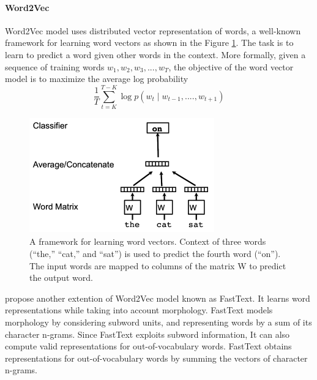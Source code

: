 \paragraph{Word2Vec} Word2Vec model uses distributed vector representation of words, a well-known framework for learning word vectors as shown in the Figure \ref{fig:Word2Vec model}. The task is to learn to predict a word given other words in the context.
More formally, given a sequence of training words
$w_{1}, w_{2}, w_{3}, ..., w_{T} $, the objective of the word vector model is to maximize the average log probability
\\
\begin{equation}
\frac{1}{T} \sum_{t=K}^{T-K} \log p(w_{t} \mid w_{t-1},....,w_{t+1}) 
\end{equation}

\begin{figure}[h]
	\centering
	\includegraphics[width=8cm, height=5cm]{w2v.png}
	\caption{A framework for learning word vectors. Context of
		three words (“the,” “cat,” and “sat”) is used to predict the fourth
		word (“on”). The input words are mapped to columns of the matrix
		W to predict the output word.}
	\label{fig:Word2Vec model}
\end{figure}


 \cite{bojanowski2016enriching} propose another extention of Word2Vec model known as FastText. It learns word
 representations while taking into account morphology.
 FastText models morphology by considering subword
 units, and representing words by a sum of its character
 n-grams.  Since FastText exploits subword information, It can also
 compute valid representations for out-of-vocabulary
 words. FastText obtains representations for out-of-vocabulary words by summing the vectors of character
 n-grams.
  
